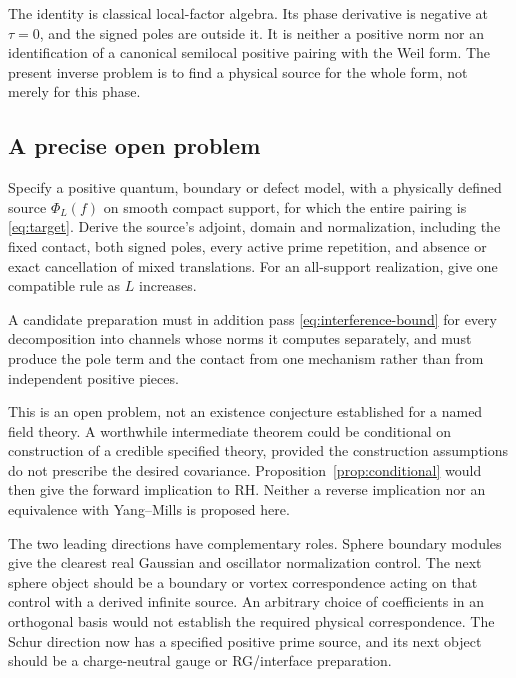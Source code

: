 The identity is classical local-factor algebra. Its phase derivative
is negative at $\tau=0$, and the signed poles are outside it. It is
neither a positive norm nor an identification of a canonical semilocal
positive pairing with the Weil form. The present inverse problem is
to find a physical source for the whole form, not merely for this phase.

\subsection{A precise open problem}
\begin{problem}\label{prob:joint}
Specify a positive quantum, boundary or defect model, with a physically
defined source $\Phi_L(f)$ on smooth compact support, for which the
entire pairing is \eqref{eq:target}. Derive the source's adjoint,
domain and normalization, including the fixed contact, both signed
poles, every active prime repetition, and absence or exact cancellation
of mixed translations. For an all-support realization, give one
compatible rule as $L$ increases.
\end{problem}

A candidate preparation must in addition pass
\eqref{eq:interference-bound} for every decomposition into channels whose
norms it computes separately, and must produce the pole term and the
contact from one mechanism rather than from independent positive pieces.

This is an open problem, not an existence conjecture established for
a named field theory. A worthwhile intermediate theorem could be
conditional on construction of a credible specified theory, provided
the construction assumptions do not prescribe the desired covariance.
Proposition~\ref{prop:conditional} would then give the forward
implication to RH. Neither a reverse implication nor an equivalence
with Yang--Mills is proposed here.

The two leading directions have complementary roles. Sphere boundary
modules give the clearest real Gaussian and oscillator normalization
control. The next sphere object should be a boundary or vortex
correspondence acting on that control with a derived infinite source.
An arbitrary choice of coefficients in an orthogonal basis would not
establish the required physical correspondence. The Schur direction
now has a specified positive prime source, and its next object should
be a charge-neutral gauge or RG/interface preparation.

